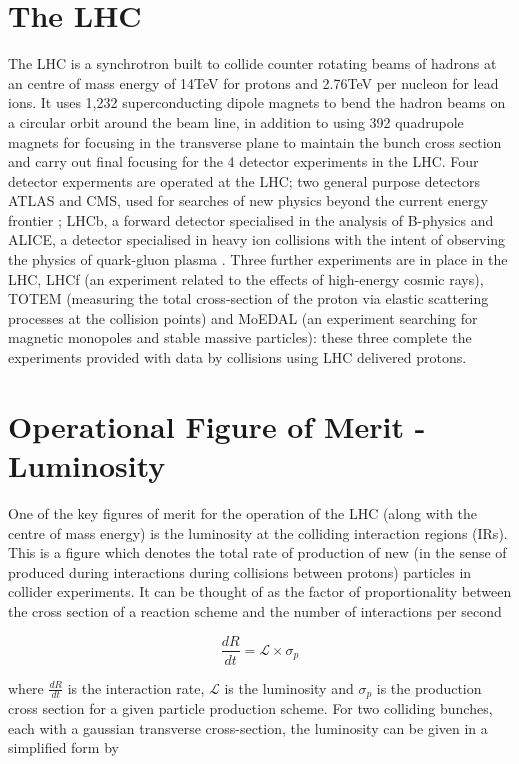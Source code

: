\section{The LHC}

The LHC is a synchrotron built to collide counter rotating beams of hadrons at an centre of mass energy of 14TeV for protons and 2.76TeV per nucleon for lead ions. It uses 1,232 superconducting dipole magnets to bend the hadron beams on a circular orbit around the beam line, in addition to using 392 quadrupole magnets for focusing in the transverse plane to maintain the bunch cross section and carry out final focusing for the 4 detector experiments in the LHC. Four detector experments are operated at the LHC; two general purpose detectors ATLAS and CMS, used for searches of new physics beyond the current energy frontier \cite{ATLASTDR,CMSDR}; LHCb, a forward detector specialised in the analysis of B-physics \cite{LHCb} and ALICE, a detector specialised in heavy ion collisions with the intent of observing the physics of quark-gluon plasma \cite{Lourenco:ALICE}. Three further experiments are in place in the LHC, LHCf (an experiment related to the effects of high-energy cosmic rays), TOTEM (measuring the total cross-section of the proton via elastic scattering processes at the collision points) and MoEDAL (an experiment searching for magnetic monopoles and stable massive particles): these three complete the experiments provided with data by collisions using LHC delivered protons.

\section{Operational Figure of Merit - Luminosity}

One of the key figures of merit for the operation of the LHC (along with the centre of mass energy) is the luminosity at the colliding interaction regions (IRs). This is a figure which denotes the total rate of production of new (in the sense of produced during interactions during collisions between protons) particles in collider experiments. It can be thought of as the factor of proportionality between the cross section of a reaction scheme and the number of interactions per second

\begin{equation} 
\frac{dR}{dt} = \mathcal{L} \times \sigma_{p}
\end{equation}

where $\frac{dR}{dt}$ is the interaction rate, $\mathcal{L}$ is the luminosity and $\sigma_{p}$ is the production cross section for a given particle production scheme. For two colliding bunches, each with a gaussian transverse cross-section, the luminosity can be given in a simplified form by

